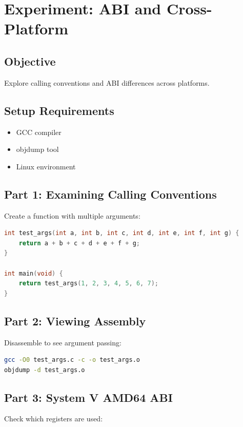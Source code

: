 \section{Experiment: ABI and Cross-Platform}

\subsection{Objective}
Explore calling conventions and ABI differences across platforms.

\subsection{Setup Requirements}
\begin{itemize}
\item GCC compiler
\item objdump tool
\item Linux environment
\end{itemize}

\subsection{Part 1: Examining Calling Conventions}

Create a function with multiple arguments:

\begin{lstlisting}[language=C]
int test_args(int a, int b, int c, int d, int e, int f, int g) {
    return a + b + c + d + e + f + g;
}

int main(void) {
    return test_args(1, 2, 3, 4, 5, 6, 7);
}
\end{lstlisting}

\subsection{Part 2: Viewing Assembly}

Disassemble to see argument passing:

\begin{lstlisting}[language=bash]
gcc -O0 test_args.c -c -o test_args.o
objdump -d test_args.o
\end{lstlisting}

\subsection{Part 3: System V AMD64 ABI}

Check which registers are used:

